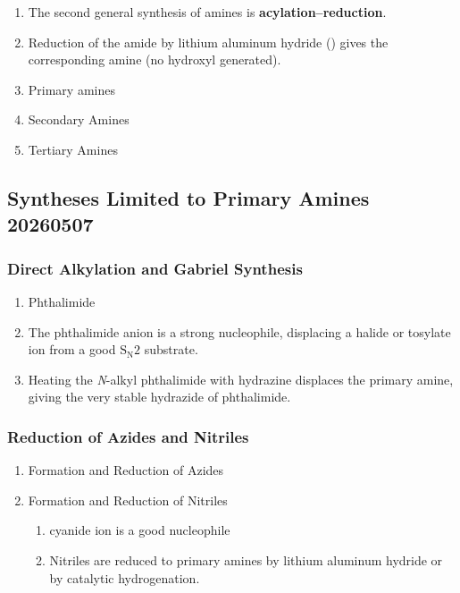 \begin{enumerate}
    \item The second general synthesis of amines is \textbf{acylation–reduction}.
    \item Reduction of the amide by lithium aluminum hydride () gives the corresponding amine (no hydroxyl generated).
    \item Primary amines
    \item Secondary Amines
    \item Tertiary Amines
\end{enumerate}

\subsection{Syntheses Limited to Primary Amines 20260507}

\subsubsection{Direct Alkylation and Gabriel Synthesis}

\begin{enumerate}
    \item Phthalimide
    \item The phthalimide anion is a strong nucleophile, displacing a halide or tosylate ion from a good $\mathrm{S}_{\mathrm{N}}2$ substrate.
    \item Heating the \textit{N}-alkyl phthalimide with hydrazine displaces the primary amine, giving the very stable hydrazide of phthalimide.
\end{enumerate}

\subsubsection{Reduction of Azides and Nitriles}

\begin{enumerate}
    \item Formation and Reduction of Azides
    \item Formation and Reduction of Nitriles
    \begin{enumerate}
        \item cyanide ion is a good nucleophile
        \item Nitriles are reduced to primary amines by lithium aluminum hydride or by catalytic hydrogenation.
    \end{enumerate}
\end{enumerate}


